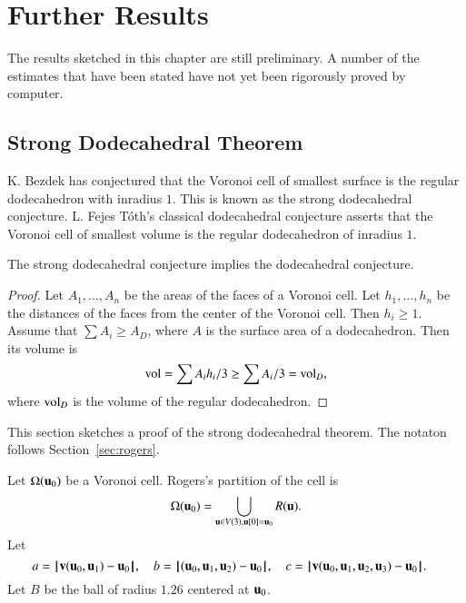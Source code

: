 
\chapter{Further Results}

\begin{note}%
The results sketched in this chapter are still preliminary.  A number of the estimates that have been stated have not yet been rigorously proved by computer. 
\end{note}

\section{Strong Dodecahedral Theorem}

K. Bezdek has conjectured that the Voronoi cell of smallest surface is the regular dodecahedron with inradius $1$.  This is known as the strong dodecahedral conjecture.  L. Fejes T\'oth's classical dodecahedral conjecture asserts that the Voronoi cell of smallest volume is the regular dodecahedron of inradius $1$.
%
%
%
%


\begin{lemma}  The strong dodecahedral conjecture implies the dodecahedral conjecture.
\end{lemma}

\begin{proof}  Let $A_1,\ldots,A_n$ be the areas of the faces of a Voronoi cell.  Let $h_1,\ldots,h_n$ be the distances of the faces from the center of the Voronoi cell.  Then $h_i\ge 1$.  Assume that $\sum A_i \ge A_D$, where $A$ is the surface area of a dodecahedron.  Then its volume is
$$
{\operatorname{vol}} = \sum A_i h_i/3 \ge \sum A_i/3 = {\operatorname{vol}}_D,
$$
where ${\operatorname{vol}}_D$ is the volume of the regular dodecahedron.
\end{proof}
%
%
%

This section sketches a proof of the strong dodecahedral theorem.  The notaton follows Section~\ref{sec:rogers}.

Let $\Omega( {\mathbf u}_0)$ be a Voronoi cell.    Rogers's partition of the cell is
$$
\Omega( {\mathbf u}_0) = \bigcup_{ {\mathbf u}\in  V(3), {\mathbf u}[0]= {\mathbf u}_0 } R( {\mathbf u}).
$$
Let 
$$
a = {\hskip0.1em|\hskip-0.15em|\hskip0.1em} {\mathbf v}( {\mathbf u}_0, {\mathbf u}_1) -    {\mathbf u}_0{\hskip0.1em|\hskip-0.15em|\hskip0.1em},\quad
b = {\hskip0.1em|\hskip-0.15em|\hskip0.1em}( {\mathbf u}_0, {\mathbf u}_1, {\mathbf u}_2) -   {\mathbf u}_0{\hskip0.1em|\hskip-0.15em|\hskip0.1em},\quad
c = {\hskip0.1em|\hskip-0.15em|\hskip0.1em} {\mathbf v}( {\mathbf u}_0, {\mathbf u}_1, {\mathbf u}_2, {\mathbf u}_3) -    {\mathbf u}_0{\hskip0.1em|\hskip-0.15em|\hskip0.1em}.\quad
$$
Let $B$ be the ball of radius $1.26$ centered at $ {\mathbf u}_0$.
%
%


